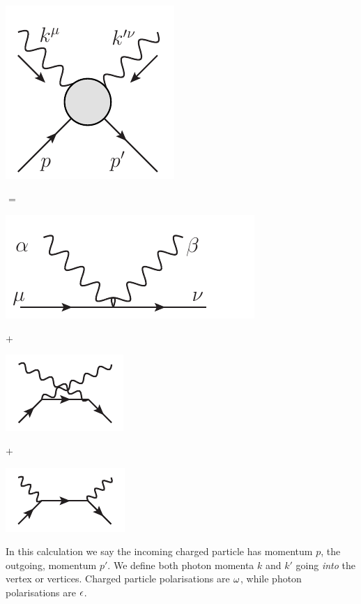\begin{minipage}{1in}
   \includegraphics[scale=0.7]{eps/blob1} 
\end{minipage}
$=$
\begin{minipage}{1.6in}
   \includegraphics[scale=0.7]{eps/two-photon-fundamental} 
\end{minipage}
$+$
\begin{minipage}{1.6in}
   \includegraphics[scale=1]{eps/crossed-small} 
\end{minipage}
$+$
\begin{minipage}{1.6in}
   \includegraphics[scale=1]{eps/uncrossed-small} 
\end{minipage}


In this calculation we say the incoming charged particle has momentum $p$, the outgoing, momentum $p'$.  We define both photon momenta $k$ and $k'$ going \emph{into} the vertex or vertices.  Charged particle polarisations are $\omega$, while photon polarisations are $\epsilon$.

